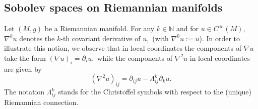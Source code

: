 \documentclass[a4paper,12pt,reqno]{amsart}%
\newcommand{\cal}{\mathcal}
\theoremstyle{definition}
\numberwithin{equation}{section}
\numberwithin{theorem}{section}
\begin{document}


\subsection{Sobolev spaces on Riemannian manifolds}

Let $(M,g)$ be a Riemannian manifold. For any $k\in \mathbb{N}$ and for $u\in C^{\infty}(M),$ $\nabla^{k}u$ denotes the $k$-th
covariant derivative of $u,$ (with $\nabla^{0}u:=u$). In order to illustrate this notion, we observe that in local coordinates the components of $\nabla u$ take the form $(\nabla u)_i=\partial_{i}u,$ while the components of $\nabla^2 u$ in local coordinates are given by
\[ (\nabla^2 u)_{ij}=\partial_{ij}u-\Lambda^{k}_{ij}\partial_k u.  \]
The notation $\Lambda^{k}_{ij}$ stands for the Christoffel symbols with respect to the (unique) Riemannian connection.\\
\end{document}
